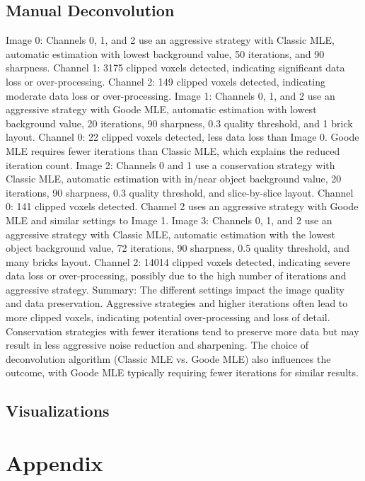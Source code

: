 \documentclass{article}
\begin{document}
\subsection*{Manual Deconvolution}

Image 0:
Channels 0, 1, and 2 use an aggressive strategy with Classic MLE, automatic estimation with lowest background value, 50 iterations, and 90 sharpness.
Channel 1: 3175 clipped voxels detected, indicating significant data loss or over-processing.
Channel 2: 149 clipped voxels detected, indicating moderate data loss or over-processing.
Image 1:
Channels 0, 1, and 2 use an aggressive strategy with Goode MLE, automatic estimation with lowest background value, 20 iterations, 90 sharpness, 0.3 quality threshold, and 1 brick layout.
Channel 0: 22 clipped voxels detected, less data loss than Image 0.
Goode MLE requires fewer iterations than Classic MLE, which explains the reduced iteration count.
Image 2:
Channels 0 and 1 use a conservation strategy with Classic MLE, automatic estimation with in/near object background value, 20 iterations, 90 sharpness, 0.3 quality threshold, and slice-by-slice layout.
Channel 0: 141 clipped voxels detected.
Channel 2 uses an aggressive strategy with Goode MLE and similar settings to Image 1.
Image 3:
Channels 0, 1, and 2 use an aggressive strategy with Classic MLE, automatic estimation with the lowest object background value, 72 iterations, 90 sharpness, 0.5 quality threshold, and many bricks layout.
Channel 2: 14014 clipped voxels detected, indicating severe data loss or over-processing, possibly due to the high number of iterations and aggressive strategy.
Summary:
The different settings impact the image quality and data preservation. Aggressive strategies and higher iterations often lead to more clipped voxels, indicating potential over-processing and loss of detail. Conservation strategies with fewer iterations tend to preserve more data but may result in less aggressive noise reduction and sharpening. The choice of deconvolution algorithm (Classic MLE vs. Goode MLE) also influences the outcome, with Goode MLE typically requiring fewer iterations for similar results.



\subsection*{Visualizations}
\clearpage
\section*{Appendix}
\end{document}
